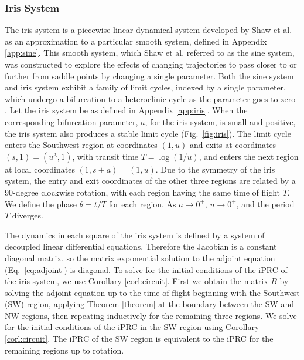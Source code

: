 \documentclass[12pt]{article}
\begin{document}
\subsubsection{Iris System}
 The iris system is a piecewise linear dynamical system developed by Shaw et al. as an approximation to a particular smooth system, defined in Appendix \ref{app:sine}.  This smooth system, which Shaw et al. referred to as the sine system, was constructed to explore the effects of changing trajectories to pass closer to or further from saddle points by changing a single parameter. Both the sine system and iris system exhibit a family of limit cycles, indexed by a single parameter, which undergo a bifurcation to a heteroclinic cycle as the parameter goes to zero \cite{ShawParkChielThomas2012SIADS}.  Let the iris system be as defined in Appendix \ref{app:iris}.  When the corresponding bifurcation parameter, $a$, for the iris system, is small and positive, the iris system also produces a stable limit cycle (Fig.~\ref{fig:iris}). The limit cycle enters the Southwest region at coordinates $(1,u)$ and exits at coordinates $(s,1)= (u^\lambda,1)$, with transit time $T = \log(1/u)$, and enters the next region at local coordinates $(1,s+a)=(1,u)$.  Due to the symmetry of the iris system, the entry and exit coordinates of the other three regions are related by a 90-degree clockwise rotation, with each region having the same time of flight $T$. We define the phase $\theta = t/
T$ for each region.  As $a \rightarrow 0^+$, $u \rightarrow 0^+$, and the period $T$ diverges.

The dynamics in each square of the iris system is defined by a system of decoupled linear differential equations.  Therefore the Jacobian is a constant diagonal matrix, so the matrix exponential solution to the adjoint equation (Eq.~\ref{eq:adjoint}) is diagonal.  To solve for the initial conditions of the iPRC of the iris system, we use Corollary \ref{corl:circuit}.  First we obtain the matrix $B$ by solving the adjoint equation up to the time of flight beginning with the Southwest (SW) region, applying Theorem \ref{theorem} at the boundary between the SW and NW regions, then repeating inductively for the remaining three regions.  We solve for the initial conditions of the iPRC in the SW region using Corollary \ref{corl:circuit}.  The iPRC of the SW region is equivalent to the iPRC for the remaining regions up to rotation.
\end{document}
